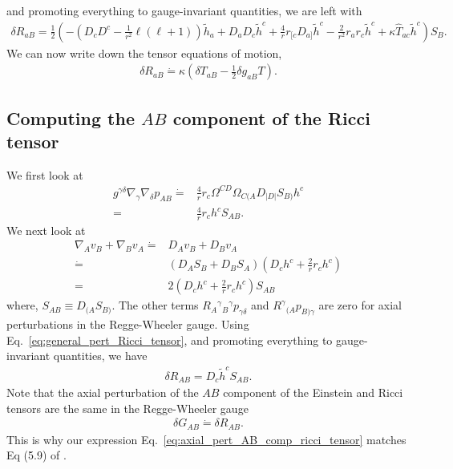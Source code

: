 \documentclass[12pt]{report}
\begin{document}
and promoting everything to gauge-invariant quantities, 
we are left with
\begin{align}
    \label{eq:axial_pert_aB_comp_ricci_tensor}
    \boxed{
        \delta R_{aB}
        =
        \frac{1}{2}
        \left(
            -
            \left(
                D_cD^c
                -
                \frac{1}{r^2}\ell\left(\ell+1\right)
            \right)
            \tilde{h}_a
            +
            D_aD_c\tilde{h}^c
            +
            \frac{4}{r}r_{[c}D_{a]}\tilde{h}^c
            -
            \frac{2}{r^2}r_ar_c
            \tilde{h}^c
            +
            \kappa \hat{T}_{ac}\tilde{h}^c
        \right)
        S_B
        .
    }
\end{align}
We can now write down the tensor equations of motion,
\begin{align}
    \delta R_{aB}
    \dot{=}
    \kappa
    \left(
        \delta T_{aB}
        -
        \frac{1}{2}\delta g_{aB} T
    \right)
    .
\end{align}
\subsection{Computing the $AB$ component of the Ricci tensor}
We first look at
\begin{align}
    g^{\gamma\delta}\nabla_{\gamma}\nabla_{\delta}p_{AB}
    \dot{=}&
    \frac{4}{r}r_c
    \Omega^{CD}\Omega_{C(A}D_{|D|}S_{B)}
    h^c 
    \nonumber\\
    =&
    \frac{4}{r}r_ch^c S_{AB}
    .
\end{align}
We next look at
\begin{align}
    \nabla_Av_B
    +
    \nabla_Bv_A
    \dot{=}&
    D_Av_B + D_Bv_A
    \nonumber\\
    \dot{=}&
    \left(D_AS_B + D_BS_A\right)
    \left(D_ch^c + \frac{2}{r}r_ch^c\right)
    \nonumber\\
    =&
    2
    \left(D_ch^c + \frac{2}{r}r_ch^c\right)
    S_{AB}
\end{align}
where, $S_{AB} \equiv D_{(A} S_{B)}$.
The other terms $R_{A}{}^{\gamma}{}_{B}{}^{\gamma}p_{\gamma\delta}$
and $R^{\gamma}{}_{(A}p_{B)\gamma}$ are zero for axial perturbations
in the Regge-Wheeler gauge.
Using Eq.~\eqref{eq:general_pert_Ricci_tensor}, 
and promoting everything to gauge-invariant quantities, we have
\begin{align}
    \label{eq:axial_pert_AB_comp_ricci_tensor}
    \boxed{
        \delta R_{AB}
        =
        D_c\tilde{h}^c S_{AB}
        .
    }
\end{align}
Note that the axial perturbation of the $AB$ component of the
Einstein and Ricci tensors are the same in the Regge-Wheeler gauge
\begin{align}
    \delta G_{AB}
    \dot{=}
    \delta R_{AB}
    .
\end{align}
This is why our expression Eq.~\eqref{eq:axial_pert_AB_comp_ricci_tensor}
matches Eq (5.9) of \cite{Martel:2005ir}.
\end{document}
